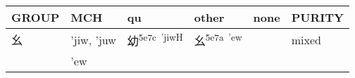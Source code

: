 \documentclass[14pt,a4paper]{scrartcl}
\begin{document}
\begin{longtable}[c]{@{}llllll@{}}
\toprule
\begin{minipage}[b]{0.14\columnwidth}\raggedright\strut
GROUP
\strut\end{minipage} &
\begin{minipage}[b]{0.14\columnwidth}\raggedright\strut
MCH
\strut\end{minipage} &
\begin{minipage}[b]{0.14\columnwidth}\raggedright\strut
qu
\strut\end{minipage} &
\begin{minipage}[b]{0.14\columnwidth}\raggedright\strut
other
\strut\end{minipage} &
\begin{minipage}[b]{0.14\columnwidth}\raggedright\strut
none
\strut\end{minipage} &
\begin{minipage}[b]{0.14\columnwidth}\raggedright\strut
PURITY
\strut\end{minipage}\tabularnewline
\midrule
\endhead
\begin{minipage}[t]{0.14\columnwidth}\raggedright\strut
幺
\strut\end{minipage} &
\begin{minipage}[t]{0.14\columnwidth}\raggedright\strut
'jiw, 'juw
\strut\end{minipage} &
\begin{minipage}[t]{0.14\columnwidth}\raggedright\strut
幼\textsuperscript{5e7c~'jiwH}
\strut\end{minipage} &
\begin{minipage}[t]{0.14\columnwidth}\raggedright\strut
幺\textsuperscript{5e7a~'ew}
\strut\end{minipage} &
\begin{minipage}[t]{0.14\columnwidth}\raggedright\strut
\strut\end{minipage} &
\begin{minipage}[t]{0.14\columnwidth}\raggedright\strut
mixed
\strut\end{minipage}\tabularnewline
\begin{minipage}[t]{0.14\columnwidth}\raggedright\strut
𢆶
\strut\end{minipage} &
\begin{minipage}[t]{0.14\columnwidth}\raggedright\strut
'ew
\strut\end{minipage} &
\begin{minipage}[t]{0.14\columnwidth}\raggedright\strut
\strut\end{minipage} &

\end{longtable}
\end{document}
